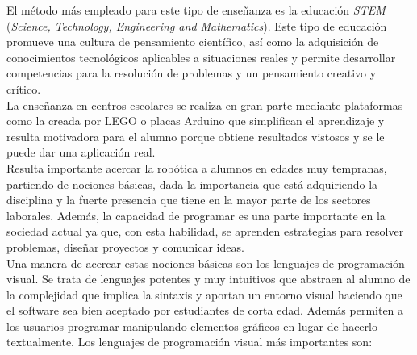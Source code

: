 El método más empleado para este tipo de enseñanza es la educación \textit{STEM} (\textit{Science, Technology, Engineering and Mathematics}). Este tipo de educación promueve una cultura de pensamiento científico, así como la adquisición de conocimientos tecnológicos aplicables a situaciones reales y permite desarrollar competencias para la resolución de problemas y un pensamiento creativo y crítico.   \\


La enseñanza en centros escolares se realiza en gran parte mediante plataformas como la creada por LEGO o placas Arduino que simplifican el aprendizaje y resulta motivadora para el alumno porque obtiene resultados vistosos y se le puede dar una aplicación real. \\

Resulta importante acercar la robótica a alumnos en edades muy tempranas, partiendo de nociones básicas, dada la importancia que está adquiriendo la disciplina y la fuerte presencia que tiene en la mayor parte de los sectores laborales. Además, la capacidad de programar es una parte importante en la sociedad actual ya que, con esta habilidad, se aprenden estrategias para resolver problemas, diseñar proyectos y comunicar ideas. \\


Una manera de acercar estas nociones básicas son los lenguajes de programación visual. Se trata de lenguajes potentes y muy intuitivos que abstraen al alumno de la complejidad que implica la sintaxis y aportan un entorno visual haciendo que el software sea bien aceptado por estudiantes de corta edad. Además permiten a los usuarios programar manipulando elementos gráficos en lugar de hacerlo textualmente. Los lenguajes de programación visual más importantes son:

